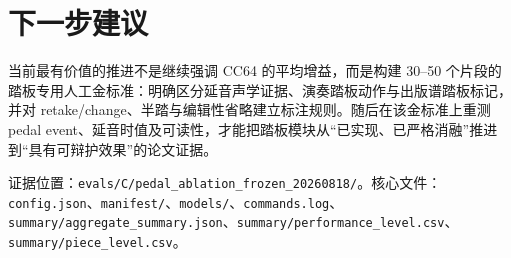 \documentclass[11pt,a4paper]{ctexart}
\begin{document}
\section{下一步建议}
当前最有价值的推进不是继续强调 CC64 的平均增益，而是构建 30--50 个片段的踏板专用人工金标准：明确区分延音声学证据、演奏踏板动作与出版谱踏板标记，并对 retake/change、半踏与编辑性省略建立标注规则。随后在该金标准上重测 pedal event、延音时值及可读性，才能把踏板模块从“已实现、已严格消融”推进到“具有可辩护效果”的论文证据。

\vfill
{\footnotesize\color{gray}\raggedright
证据位置：\texttt{evals/C/pedal\_ablation\_frozen\_20260818/}。核心文件：\texttt{config.json}、\texttt{manifest/}、\texttt{models/}、\texttt{commands.log}、\texttt{summary/aggregate\_summary.json}、\texttt{summary/performance\_level.csv}、\texttt{summary/piece\_level.csv}。\par}
\end{document}
